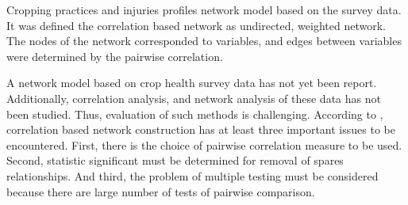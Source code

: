 Cropping practices and injuries profiles network model based on the survey data. It was defined the correlation based network as undirected, weighted network. The nodes of the network corresponded to variables, and edges between variables were determined by the pairwise correlation.

A network model based on crop health survey data has not yet been report. Additionally, correlation analysis, and network analysis of these data has not been studied. Thus, evaluation of such methods is challenging. According to , correlation based network construction has at least three important issues to be encountered. First, there is the choice of pairwise correlation measure to be used. Second, statistic significant must be determined for removal of spares relationships. And third, the problem of multiple testing must be considered because there are large number of tests of pairwise comparison.




